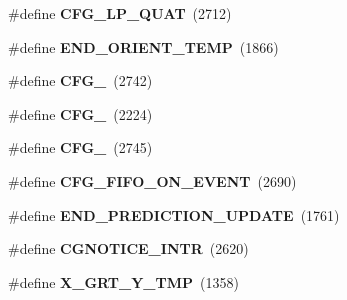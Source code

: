 \begin{DoxyCompactItemize}
\item 
\#define {\bfseries C\+F\+G\+\_\+\+L\+P\+\_\+\+Q\+U\+AT}~(2712)\hypertarget{group___d_r_i_v_e_r_s_gadf5652e51b8c08c2eb6a902d1d1f319c}{}\label{group___d_r_i_v_e_r_s_gadf5652e51b8c08c2eb6a902d1d1f319c}

\item 
\#define {\bfseries E\+N\+D\+\_\+\+O\+R\+I\+E\+N\+T\+\_\+\+T\+E\+MP}~(1866)\hypertarget{group___d_r_i_v_e_r_s_ga5c2c9516862587e8e1aa8c0c428076d9}{}\label{group___d_r_i_v_e_r_s_ga5c2c9516862587e8e1aa8c0c428076d9}

\item 
\#define {\bfseries C\+F\+G\+\_}~(2742)\hypertarget{group___d_r_i_v_e_r_s_gaae53afa64170cb4723c04f16c2fa5f30}{}\label{group___d_r_i_v_e_r_s_gaae53afa64170cb4723c04f16c2fa5f30}

\item 
\#define {\bfseries C\+F\+G\+\_}~(2224)\hypertarget{group___d_r_i_v_e_r_s_ga12aa4c3bdc65c24ca29ef08e62fd3e13}{}\label{group___d_r_i_v_e_r_s_ga12aa4c3bdc65c24ca29ef08e62fd3e13}

\item 
\#define {\bfseries C\+F\+G\+\_}~(2745)\hypertarget{group___d_r_i_v_e_r_s_ga18ca772a0ce432c5ccb0e318af3c2b86}{}\label{group___d_r_i_v_e_r_s_ga18ca772a0ce432c5ccb0e318af3c2b86}

\item 
\#define {\bfseries C\+F\+G\+\_\+\+F\+I\+F\+O\+\_\+\+O\+N\+\_\+\+E\+V\+E\+NT}~(2690)\hypertarget{group___d_r_i_v_e_r_s_ga7aa6ed56d6fd41be120b9bdb488c220a}{}\label{group___d_r_i_v_e_r_s_ga7aa6ed56d6fd41be120b9bdb488c220a}

\item 
\#define {\bfseries E\+N\+D\+\_\+\+P\+R\+E\+D\+I\+C\+T\+I\+O\+N\+\_\+\+U\+P\+D\+A\+TE}~(1761)\hypertarget{group___d_r_i_v_e_r_s_ga89e5662bddc67ac00f5b85035bd60ed8}{}\label{group___d_r_i_v_e_r_s_ga89e5662bddc67ac00f5b85035bd60ed8}

\item 
\#define {\bfseries C\+G\+N\+O\+T\+I\+C\+E\+\_\+\+I\+N\+TR}~(2620)\hypertarget{group___d_r_i_v_e_r_s_gafd43f64b7c6bc86374cedfcf69c6b12f}{}\label{group___d_r_i_v_e_r_s_gafd43f64b7c6bc86374cedfcf69c6b12f}

\item 
\#define {\bfseries X\+\_\+\+G\+R\+T\+\_\+\+Y\+\_\+\+T\+MP}~(1358)\hypertarget{group___d_r_i_v_e_r_s_ga0ff907b44d0e42641e71e6da41829090}{}\label{group___d_r_i_v_e_r_s_ga0ff907b44d0e42641e71e6da41829090}


\end{DoxyCompactItemize}
